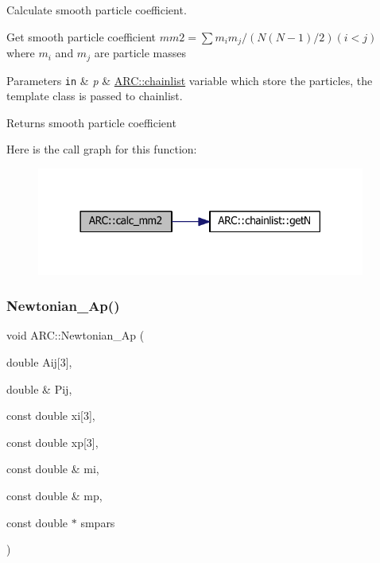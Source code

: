 Calculate smooth particle coefficient. 

Get smooth particle coefficient $ mm2 = \sum m_i m_j /(N (N-1)/2) (i<j) $ where $m_i$ and $m_j$ are particle masses 
\begin{DoxyParams}[1]{Parameters}
\mbox{\tt in}  & {\em p} & \hyperlink{classARC_1_1chainlist}{A\+R\+C\+::chainlist} variable which store the particles, the template class is passed to chainlist. \\
\hline
\end{DoxyParams}
\begin{DoxyReturn}{Returns}
smooth particle coefficient 
\end{DoxyReturn}
Here is the call graph for this function\+:
\nopagebreak
\begin{figure}[H]
\begin{center}
\leavevmode
\includegraphics[width=306pt]{namespaceARC_a8d6c876e9d20067d0e8a5c1c4c2c4be6_cgraph}
\end{center}
\end{figure}
\hypertarget{namespaceARC_a70d2d18fc72d05606cb2c991ada4c64b}{}\label{namespaceARC_a70d2d18fc72d05606cb2c991ada4c64b} 
\subsubsection{\texorpdfstring{Newtonian\+\_\+\+Ap()}{Newtonian\_Ap()}}
{\footnotesize\ttfamily void A\+R\+C\+::\+Newtonian\+\_\+\+Ap (\begin{DoxyParamCaption}\item[{double}]{Aij\mbox{[}3\mbox{]},  }\item[{double \&}]{Pij,  }\item[{const double}]{xi\mbox{[}3\mbox{]},  }\item[{const double}]{xp\mbox{[}3\mbox{]},  }\item[{const double \&}]{mi,  }\item[{const double \&}]{mp,  }\item[{const double $\ast$}]{smpars }\end{DoxyParamCaption})}



